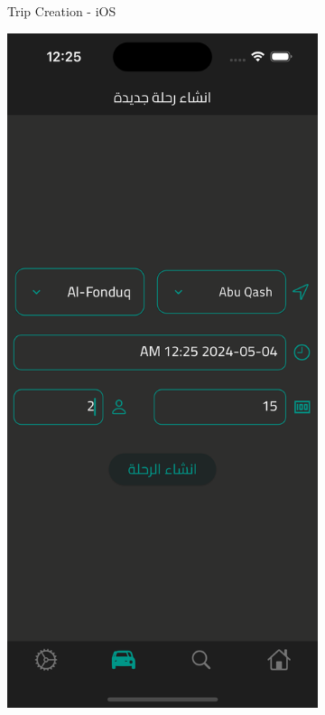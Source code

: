 \documentclass[a4paper, 12pt]{report} %
\begin{document}
\begin{figure}[H]
\begin{subfigure}{0.3\textwidth}
                    \caption{Trip Creation - iOS}
                    \label{fig:trip_cration_1}
                \end{subfigure}
                \begin{subfigure}{0.3\textwidth}
                    \includegraphics[width=\linewidth]{Images/trip_creation_2.png}

\end{subfigure}
\end{figure}
\end{document}
